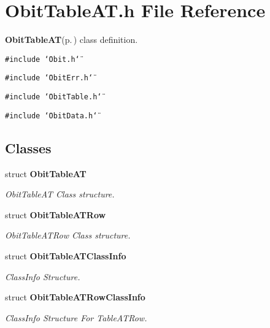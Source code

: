 \section{Obit\-Table\-AT.h File Reference}
\label{ObitTableAT_8h}
{\bf Obit\-Table\-AT}{\rm (p.\,\pageref{structObitTableAT})} class definition. 

{\tt \#include \char`\"{}Obit.h\char`\"{}}\par
{\tt \#include \char`\"{}Obit\-Err.h\char`\"{}}\par
{\tt \#include \char`\"{}Obit\-Table.h\char`\"{}}\par
{\tt \#include \char`\"{}Obit\-Data.h\char`\"{}}\par
\subsection*{Classes}
\begin{CompactItemize}
\item 
struct {\bf Obit\-Table\-AT}
\begin{CompactList}\small\item\em Obit\-Table\-AT Class structure. \item\end{CompactList}\item 
struct {\bf Obit\-Table\-ATRow}
\begin{CompactList}\small\item\em Obit\-Table\-ATRow Class structure. \item\end{CompactList}\item 
struct {\bf Obit\-Table\-ATClass\-Info}
\begin{CompactList}\small\item\em Class\-Info Structure. \item\end{CompactList}\item 
struct {\bf Obit\-Table\-ATRow\-Class\-Info}
\begin{CompactList}\small\item\em Class\-Info Structure For Table\-ATRow. \item\end{CompactList}\end{CompactItemize}
